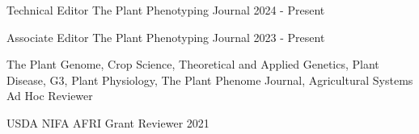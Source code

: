 
\begin{cventries}

  \cventry
    {Technical Editor} %
    {The Plant Phenotyping Journal} %
    {} %
    {2024 - Present} %
    {}

  \cventry
    {Associate Editor} %
    {The Plant Phenotyping Journal} %
    {} %
    {2023 - Present} %
    {}

  \cventry
    {The Plant Genome, Crop Science, Theoretical and Applied Genetics, Plant Disease, G3, Plant Physiology, The Plant Phenome Journal, Agricultural Systems} %
    {Ad Hoc Reviewer} %
    {} %
    {} %
    {}

  \cventry
    {USDA NIFA AFRI} %
    {Grant Reviewer} %
    {} %
    {2021} %
    {}

\end{cventries}
